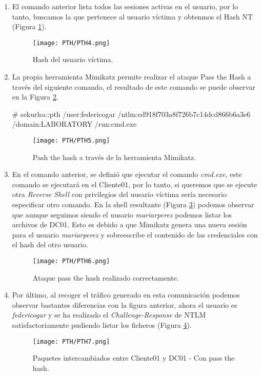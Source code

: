 \begin{enumerate}
\item El comando anterior lista todos las sesiones activas en el usuario, por lo tanto, buscamos la que pertenece al usuario víctima y obtenmos el Hash NT (Figura \ref{PTH4}).
\begin{figure}[H] %
\begin{center}
\texttt{[image: PTH/PTH4.png]}
\end{center}
\caption{Hash del usuario víctima.}
\label{PTH4}
\end{figure}

\item La propia herramienta Mimikatz permite realizar el ataque Pass the Hash a través del siguiente comando, el resultado de este comando se puede observar en la Figura \ref{PTH5}.
\begin{listing}[style=consola, numbers=none]
# sekurlsa::pth /user:federicogar /ntlm:ed918f703a8f726b7c14dcd866b6a3e6 /domain:LABORATORY /run:cmd.exe
\end{listing}


\begin{figure}[H] %
\begin{center}
\texttt{[image: PTH/PTH5.png]}
\end{center}
\caption{Pash the hash a través de la herramienta Mimikatz.}
\label{PTH5}
\end{figure}

\item En el comando anterior, se definió que ejecutar el comando {\it cmd.exe}, este comando se ejecutará en el Cliente01, por lo tanto, si queremos que se ejecute otra {\it Reverse Shell} con privilegios del uusario víctima sería necesario especificar otro comando. En la shell resultante (Figura \ref{PTH6}) podemos observar que aunque seguimos siendo el uusario {\it mariarperez} podemos listar los archivos de DC01. Esto es debido a que Mimikatz genera una nueva sesión para el usuario {\it mariarperez} y sobreescribe el contenido de las credenciales con el hash del otro usuario. 
\begin{figure}[H] %
\begin{center}
\texttt{[image: PTH/PTH6.png]}
\end{center}
\caption{Ataque pass the hash realizado correctamente.}
\label{PTH6}
\end{figure}

\item Por último, al recoger el tráfico generado en esta comunicación podemos observar bastantes diferencias con la figura anterior, ahora el usuario es {\it federicogar} y se ha realizado el {\it Challenge-Response} de NTLM satisfactoriamente pudiendo listar los ficheros (Figura \ref{PTH7}).
\begin{figure}[H] %
\begin{center}
\texttt{[image: PTH/PTH7.png]}
\end{center}
\caption{Paquetes intercambiados entre Cliente01 y DC01 - Con pass the hash.}
\label{PTH7}
\end{figure}


\end{enumerate}
